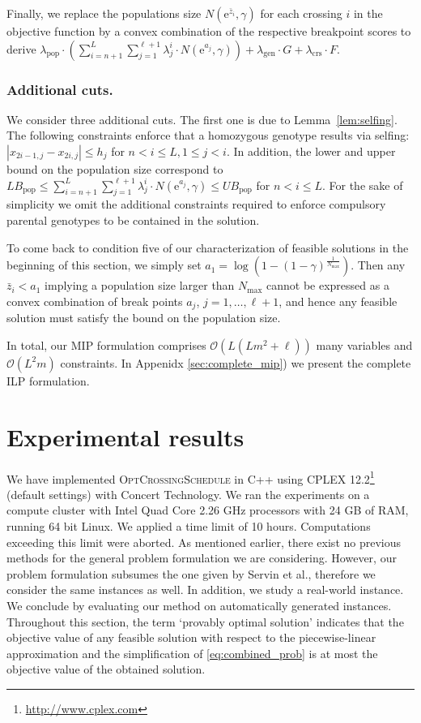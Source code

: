 \documentclass[runningheads]{llncs}
\newcommand{\BigOh}{\ensuremath{\mathcal{O}}}
\begin{document}
Finally, we replace the populations size $N(\mathrm e^{\bar{z}_i},\gamma)$ for each crossing $i$
in the objective function by a convex combination of the respective breakpoint scores to derive 
$\lambda_{\mathrm{pop}}\cdot\left(\sum_{i=n+1}^L\sum_{j=1}^{\ell+1} \lambda^i_j\cdot N(\mathrm e^{a_j},\gamma)\right) + \lambda_{\mathrm{gen}}\cdot G + \lambda_{\mathrm{crs}}\cdot F.$



\subsubsection{Additional cuts.} We consider three additional cuts. The first one is due to Lemma~\ref{lem:selfing}. The following constraints enforce that a homozygous genotype results via selfing: $|x_{2i-1,j} - x_{2i,j}| \leq h_j$ for $n < i \leq L, 1 \leq j < i$.
In addition, the lower and upper bound on the population size correspond to
  $\mathit{LB}_\mathrm{pop} \leq \sum_{i=n+1}^L\sum_{j=1}^{\ell+1} \lambda^i_j\cdot N(\mathrm e^{a_j},\gamma) \leq \mathit{UB}_\mathrm{pop}$ for $n < i \leq L$.
For the sake of simplicity we omit the additional constraints required to enforce compulsory parental genotypes to be contained in the solution. 

To come back to condition five of our characterization of feasible solutions in the beginning of this section, 
we simply set $a_1=\log(1 - (1 - \gamma)^\frac{1}{N_\mathrm{max}})$. Then any $\bar{z}_i<a_1$ implying a population size larger than $N_{\mathrm{max}}$
cannot be expressed as a convex combination of break points $a_j$, $j=1,\dots,\ell+1$,  and hence any feasible solution must satisfy the bound on the population size.

In total, our MIP formulation comprises $\BigOh(L(Lm^2+\ell))$ many variables and $\BigOh(L^2 m)$ constraints. In Appenidx \ref{sec:complete_mip}) we present the complete ILP formulation.
\section{Experimental results}
\label{sec:exp}

We have implemented \textsc{OptCrossingSchedule} in C++ using CPLEX 12.2\footnote{\url{http://www.cplex.com}} (default settings) with Concert
Technology. We ran the experiments on a compute cluster with Intel Quad Core 2.26 GHz processors with 24 GB of RAM, running 64 bit Linux.
We applied a time limit of 10 hours. Computations exceeding this limit were aborted.
As mentioned earlier, there exist no previous methods for the general problem formulation we are considering. However, our problem formulation subsumes the one given by Servin et al., therefore we consider the same instances as well. In addition, we study a real-world instance. We conclude by evaluating our method on automatically generated instances. Throughout this section, the term `provably optimal solution' indicates that the objective value of any feasible solution with respect to the piecewise-linear approximation and the simplification of \eqref{eq:combined_prob} is at most the objective value of the obtained solution.
\end{document}
